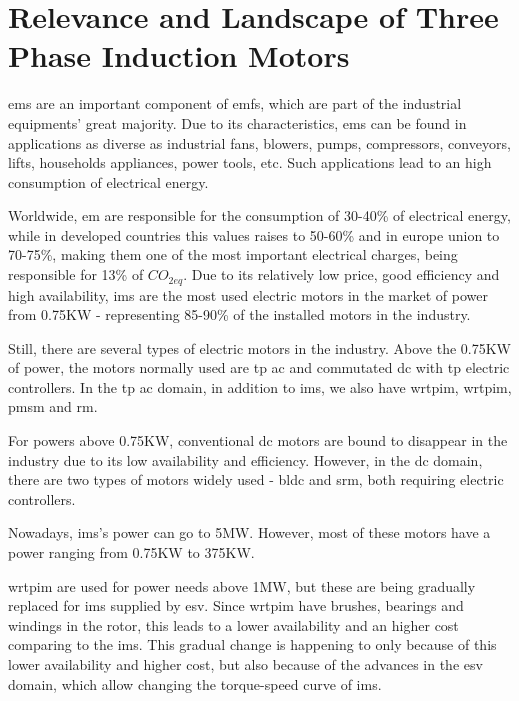 \section{Relevance and Landscape of Three Phase Induction Motors} %
\label{sec:tpin_relevance}

\acrshort{em}s are an important component of \acrshort{emfs}, which are part of the industrial equipments' great majority. Due to its characteristics, \acrshort{em}s can be found in applications as diverse as industrial fans, blowers, pumps, compressors, conveyors, lifts, households appliances, power tools, etc. 
Such applications lead to an high consumption of electrical energy.

Worldwide, \acrshort{em} are responsible for the consumption of 30-40\% of electrical energy, while in developed countries this values raises to 50-60\% and in europe union to 70-75\%, making them one of the most important electrical charges, being responsible for 13\% of $CO_{2eq}$. 
Due to its relatively low price, good efficiency and high availability, \acrshort{ims}  are the most used electric motors in the market of power from 0.75KW - representing 85-90\% of the installed motors in the industry. 

Still, there are several types of electric motors in the industry. Above the 0.75KW of power, the motors normally used are \acrshort{tp} \acrshort{ac} and commutated \acrshort{dc} with \acrshort{tp} electric controllers.
In the \acrshort{tp} \acrshort{ac} domain, in addition to \acrshort{ims}, we also have \acrfull{wrtpim}, \acrfull{wrtpim}, \acrfull{pmsm} and \acrfull{rm}. 

For powers above 0.75KW, conventional \acrshort{dc} motors are bound to disappear in the industry due to its low availability and efficiency. However, in the \acrshort{dc} domain, there are two types of motors widely used - \acrfull{bldc} and \acrfull{srm}, both requiring electric controllers.

Nowadays, \acrshort{ims}'s power can go to 5MW. However, most of these motors have a power ranging from 0.75KW to 375KW. 

\acrshort{wrtpim} are used for power needs above 1MW, but these are being gradually replaced for \acrshort{ims} supplied by \acrfull{esv}. Since \acrshort{wrtpim} have brushes, bearings and windings in the rotor, this leads to a lower availability and an higher cost comparing to the \acrshort{ims}. This gradual change is happening to only because of this lower availability and higher cost, but also because of the advances in the  \acrfull{esv} domain, which allow changing the torque-speed curve of \acrshort{ims}.

